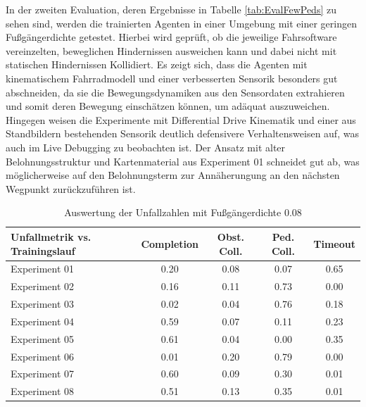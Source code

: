 In der zweiten Evaluation, deren Ergebnisse in Tabelle \ref{tab:EvalFewPeds} zu sehen sind,
werden die trainierten Agenten in einer Umgebung mit einer geringen Fußgängerdichte getestet.
Hierbei wird geprüft, ob die jeweilige Fahrsoftware vereinzelten, beweglichen Hindernissen
ausweichen kann und dabei nicht mit statischen Hindernissen Kollidiert. Es zeigt sich,
dass die Agenten mit kinematischem Fahrradmodell und einer verbesserten Sensorik besonders
gut abschneiden, da sie die Bewegungsdynamiken aus den Sensordaten extrahieren und somit
deren Bewegung einschätzen können, um adäquat auszuweichen. Hingegen weisen die Experimente
mit Differential Drive Kinematik und einer aus Standbildern bestehenden Sensorik deutlich
defensivere Verhaltensweisen auf, was auch im Live Debugging zu beobachten ist. Der Ansatz
mit alter Belohnungsstruktur und Kartenmaterial aus Experiment 01 schneidet gut ab,
was möglicherweise auf den Belohnungsterm zur Annäherungung an den nächsten Wegpunkt
zurückzuführen ist.\\

\begin{table}[h]
\centering
\begin{tabular}{ |p{3cm}||c|c|c|c| }
 \hline
 Unfallmetrik vs. Trainingslauf & Completion & Obst. Coll. & Ped. Coll. & Timeout \\
 \hline \hline
 Experiment 01 & 0.20 & 0.08 & 0.07 & 0.65 \\ \hline
 Experiment 02 & 0.16 & 0.11 & 0.73 & 0.00 \\ \hline
 Experiment 03 & 0.02 & 0.04 & 0.76 & 0.18 \\ \hline
 Experiment 04 & 0.59 & 0.07 & 0.11 & 0.23 \\ \hline
 Experiment 05 & 0.61 & 0.04 & 0.00 & 0.35 \\ \hline
 Experiment 06 & 0.01 & 0.20 & 0.79 & 0.00 \\ \hline
 Experiment 07 & 0.60 & 0.09 & 0.30 & 0.01 \\ \hline
 Experiment 08 & 0.51 & 0.13 & 0.35 & 0.01 \\
 \hline
\end{tabular}
\caption{Auswertung der Unfallzahlen mit Fußgängerdichte 0.08}
 \label{tab:EvalManyPeds}
\end{table}

